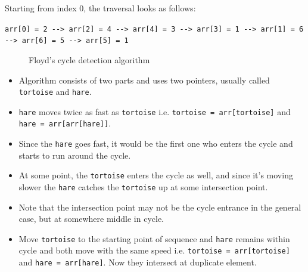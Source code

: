 \documentclass[a4paper,11pt]{book}
\begin{document}
\noindent Starting from index 0, the traversal looks as follows:
\vspace{3mm}

\noindent \lstinline{arr[0] = 2 --> arr[2] = 4 --> arr[4] = 3 --> arr[3] = 1 --> arr[1] = 6 --> arr[6] = 5 --> arr[5] = 1}
\vspace{5mm}

\begin{figure}[ht]
\begin{center}
\end{center}
\caption{Floyd's cycle detection algorithm}
\end{figure}
\vspace{5mm}

\begin{itemize}

\item Algorithm consists of two parts and uses two pointers, usually called \lstinline{tortoise} and \lstinline{hare}.
\item \lstinline{hare} moves twice as fast as \lstinline{tortoise} i.e. \lstinline{tortoise = arr[tortoise]} and \lstinline{hare = arr[arr[hare]]}.
\item Since the \lstinline{hare} goes fast, it would be the first one who enters the cycle and starts to run around the cycle.
\item At some point, the \lstinline{tortoise} enters the cycle as well, and since it’s moving slower the \lstinline{hare} catches the \lstinline{tortoise} up at some intersection point.
\item Note that the intersection point may not be the cycle entrance in the general case, but at somewhere middle in cycle.
\item Move \lstinline{tortoise} to the starting point of sequence and \lstinline{hare} remains within cycle and both move with the same speed i.e. \lstinline{tortoise = arr[tortoise]} and \lstinline{hare = arr[hare]}. Now they intersect at duplicate element.

\end{itemize}
\end{document}
